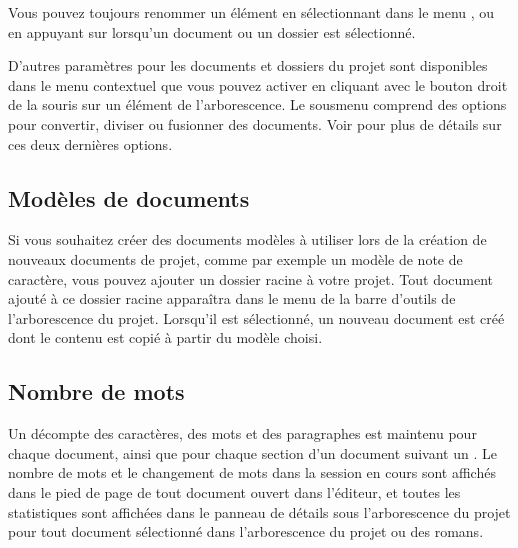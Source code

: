 \documentclass[a4paper,11pt,french]{sphinxmanual}
\begin{document}
\sphinxAtStartPar
Vous pouvez toujours renommer un élément en sélectionnant  dans le menu , ou en appuyant sur  lorsqu’un document ou un dossier est sélectionné.

\sphinxAtStartPar
D’autres paramètres pour les documents et dossiers du projet sont disponibles dans le menu contextuel que vous pouvez activer en cliquant avec le bouton droit de la souris sur un élément de l’arborescence. Le sous\sphinxhyphen{}menu  comprend des options pour convertir, diviser ou fusionner des documents. Voir {\hyperref[\detokenize{usage_project:a-ui-tree-split-merge}]{}} pour plus de détails sur ces deux dernières options.


\subsection{Modèles de documents}
\label{\detokenize{project_overview:document-templates}}
\sphinxAtStartPar
Si vous souhaitez créer des documents modèles à utiliser lors de la création de nouveaux documents de projet, comme par exemple un modèle de note de caractère, vous pouvez ajouter un dossier racine  à votre projet. Tout document ajouté à ce dossier racine apparaîtra dans le menu  de la barre d’outils de l’arborescence du projet. Lorsqu’il est sélectionné, un nouveau document est créé dont le contenu est copié à partir du modèle choisi.

\sphinxAtStartPar
{}


\subsection{Nombre de mots}
\label{\detokenize{project_overview:word-counts}}\label{\detokenize{project_overview:a-proj-files-counts}}
\sphinxAtStartPar
Un décompte des caractères, des mots et des paragraphes est maintenu pour chaque document, ainsi que pour chaque section d’un document suivant un {\hyperref[\detokenize{int_glossary:term-Headings}]{}}. Le nombre de mots et le changement de mots dans la session en cours sont affichés dans le pied de page de tout document ouvert dans l’éditeur, et toutes les statistiques sont affichées dans le panneau de détails sous l’arborescence du projet pour tout document sélectionné dans l’arborescence du projet ou des romans.
\end{document}
